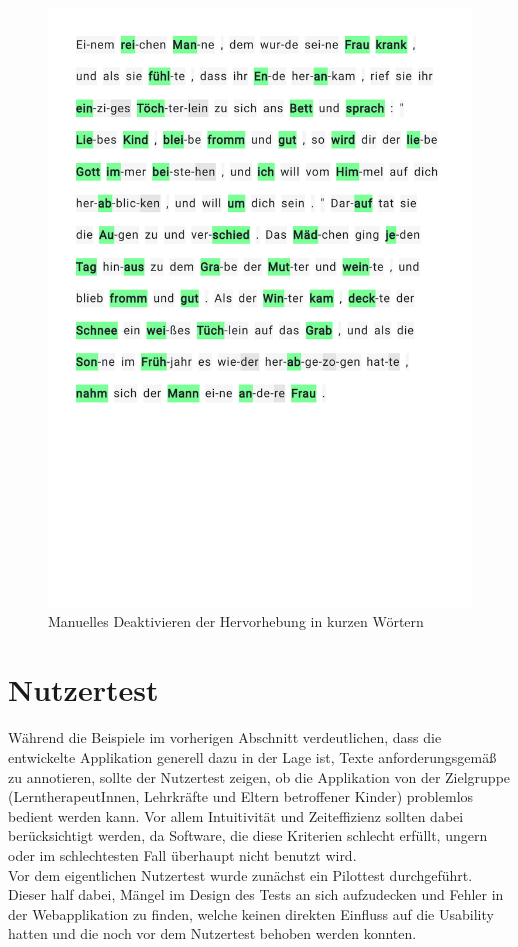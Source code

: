 \begin{figure}[h!]
	\centering
	\includegraphics[width=.7\linewidth, frame]{figures/evaluation/annotation5}
	\caption{Manuelles Deaktivieren der Hervorhebung in kurzen Wörtern}
	\label{fig:evaluation-ex5}
\end{figure}
\newpage

\section{Nutzertest}
\label{sec:usertest}

Während die Beispiele im vorherigen Abschnitt verdeutlichen, dass die entwickelte Applikation generell dazu in der Lage ist, Texte anforderungsgemäß zu annotieren, sollte der Nutzertest zeigen, ob die Applikation von der Zielgruppe (LerntherapeutInnen, Lehrkräfte und Eltern betroffener Kinder) problemlos bedient werden kann. Vor allem Intuitivität und Zeiteffizienz sollten dabei berücksichtigt werden, da Software, die diese Kriterien schlecht erfüllt, ungern oder im schlechtesten Fall überhaupt nicht benutzt wird.\\
Vor dem eigentlichen Nutzertest wurde zunächst ein Pilottest durchgeführt. Dieser half dabei, Mängel im Design des Tests an sich aufzudecken und Fehler in der Webapplikation zu finden, welche keinen direkten Einfluss auf die Usability hatten und die noch vor dem Nutzertest behoben werden konnten.

